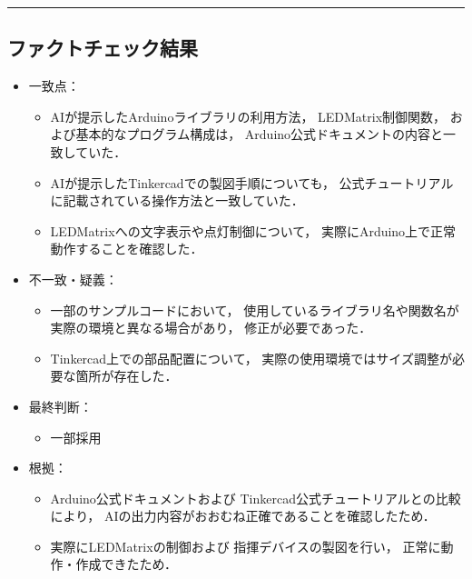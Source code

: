 \documentclass[uplatex,dvipdfmx,a4paper,11pt]{jsarticle}
\newcommand{\sectionrule}{\par\medskip\noindent\rule{\linewidth}{0.6pt}\par\medskip}
\begin{document}
\sectionrule

\subsection{ファクトチェック結果}


\begin{itemize}

    \item 一致点：
      \begin{itemize}
        \item AIが提示したArduinoライブラリの利用方法，
        LEDMatrix制御関数，
        および基本的なプログラム構成は，
        Arduino公式ドキュメントの内容と一致していた．
  
        \item AIが提示したTinkercadでの製図手順についても，
        公式チュートリアルに記載されている操作方法と一致していた．
  
        \item LEDMatrixへの文字表示や点灯制御について，
        実際にArduino上で正常動作することを確認した．
      \end{itemize}

      \item 不一致・疑義：
    \begin{itemize}
      \item 一部のサンプルコードにおいて，
      使用しているライブラリ名や関数名が実際の環境と異なる場合があり，
      修正が必要であった．

      \item Tinkercad上での部品配置について，
      実際の使用環境ではサイズ調整が必要な箇所が存在した．
    \end{itemize}

  \item 最終判断：
    \begin{itemize}
      \item 一部採用
    \end{itemize}

    \item 根拠：
    \begin{itemize}
      \item Arduino公式ドキュメントおよび
      Tinkercad公式チュートリアルとの比較により，
      AIの出力内容がおおむね正確であることを確認したため．

      \item 実際にLEDMatrixの制御および
      指揮デバイスの製図を行い，
      正常に動作・作成できたため．
    \end{itemize}

\end{itemize}
\end{document}
